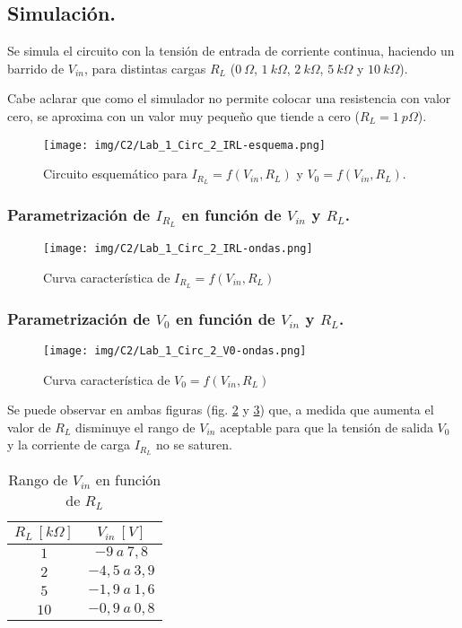 \subsection{Simulación.}
Se simula el circuito con la tensión de entrada de corriente continua, haciendo un barrido de $V_{in}$, para distintas cargas $R_L$ ($0~\Omega$, $1~k\Omega$, $2~k\Omega$, $5~k\Omega$ y $10~k\Omega$).

Cabe aclarar que como el simulador no permite colocar una resistencia con valor cero, se aproxima con un valor muy pequeño que tiende a cero ($R_L=1~p\Omega$).

\begin{figure}[H]
    \texttt{[image: img/C2/Lab\_1\_Circ\_2\_IRL-esquema.png]}
    \caption{Circuito esquemático para $I_{R_L}=f(V_{in}, R_L)$ y $V_0=f(V_{in}, R_L)$.}
    \label{fig:Lab_1_Circ_2_IRL+V0-esquema}
\end{figure}

\subsubsection{Parametrización de $I_{R_L}$ en función de $V_{in}$ y $R_L$.}

\begin{figure}[H]
    \centering
    \texttt{[image: img/C2/Lab\_1\_Circ\_2\_IRL-ondas.png]}
    \caption{Curva característica de $I_{R_L}=f(V_{in}, R_L)$}
    \label{fig:Lab_1_Circ_2_IRL-ondas}
\end{figure}

\subsubsection{Parametrización de $V_0$ en función de $V_{in}$ y $R_L$.}

\begin{figure}[H]
    \centering
    \texttt{[image: img/C2/Lab\_1\_Circ\_2\_V0-ondas.png]}
    \caption{Curva característica de $V_0=f(V_{in}, R_L)$}
    \label{fig:Lab_1_Circ_2_V0-ondas}
\end{figure}

Se puede observar en ambas figuras (fig. \ref{fig:Lab_1_Circ_2_IRL-ondas} y \ref{fig:Lab_1_Circ_2_V0-ondas}) que, a medida que aumenta el valor de $R_L$ disminuye el rango de $V_{in}$ aceptable para que la tensión de salida $V_0$ y la corriente de carga $I_{R_L}$ no se saturen.

\begin{table}[H]
    \centering
    \begin{tabular}{|c|c|} \hline 
         $R_L~[k\Omega]$& $V_{in}~[V]$\\ \hline 
         $1$& $-9  ~a~7,8$\\ \hline 
         $2$& $-4,5~a~3,9$\\ \hline 
         $5$& $-1,9~a~1,6$\\ \hline 
         $10$&$-0,9~a~0,8$\\ \hline
    \end{tabular}
    \caption{Rango de $V_{in}$ en función de $R_L$}
    \label{tab:Vin=f(RL)}
\end{table}

